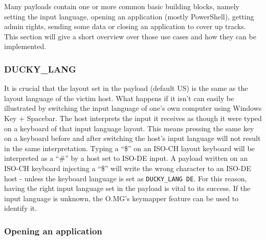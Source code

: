 Many payloads contain one or more common basic building blocks, namely setting the input language, opening an application (mostly PowerShell), getting admin rights, sending some data or closing an application to cover up tracks.  \\
This section will give a short overview over those use cases and how they can be implemented.

\subsubsection{DUCKY\_LANG} \label{ducky\_lang}

It is crucial that the layout set in the payload (default US) is the same as the layout language of the victim host. What happens if it isn't can easily be illustrated by switching the input language of one's own computer using Windows Key + Spacebar. The host interprets the input it receives as though it were typed on a keyboard of that input language layout. This means pressing the same key on a keyboard before and after switching the host's input language will not result in the same interpretation. Typing a ``\$'' on an ISO-CH layout keyboard will be interpreted as a ``\#'' by a host set to ISO-DE input. A payload written on an ISO-CH keyboard injecting a ``\$''  will write the wrong character to an ISO-DE host - unless the keyboard language is set as \verb|DUCKY_LANG DE|. 
For this reason, having the right input language set in the payload is vital to its success. If the input language is unknown, the O.MG's keymapper feature can be used to identify it.



\subsubsection{Opening an application}

